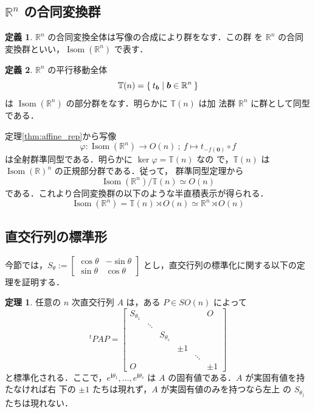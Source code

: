 \documentclass[11pt, uplatex, dvipdfmx, titlepage]{jsarticle}
\renewcommand{\i}{\mathbf{i}}
\DeclareMathOperator{\Isom}{Isom}
\theoremstyle{definition}
\newtheorem{theorem}{定理}[section]
\newtheorem*{definition}{定義}
\begin{document}
\subsection{$\mathbb{R}^n$ の合同変換群}

\begin{definition}
  $\mathbb{R}^n$ の合同変換全体は写像の合成により群をなす．この群
  を $\mathbb{R}^n$ の合同変換群といい，$\Isom(\mathbb{R}^n)$ で表す．
\end{definition}

\begin{definition}
  $\mathbb{R}^n$ の平行移動全体
  \[
    \mathbb{T}(n)=\Set{ t_{\bm{b}} | \bm{b} \in \mathbb{R}^n}
  \]
  は $\Isom(\mathbb{R}^n)$ の部分群をなす．明らかに $\mathbb{T}(n)$ は加
  法群 $\mathbb{R}^n$ に群として同型である．
\end{definition}


定理\ref{thm:affine_rep}から写像
\[
  \varphi : \Isom(\mathbb{R}^n) \to O(n) \ ; \ f \mapsto t_{-f(\bm{0})} \circ f
\]
は全射群準同型である．明らかに $\ker \varphi = \mathbb{T}(n)$ なの
で，$\mathbb{T}(n)$ は $\Isom(\mathbb{R})^n$ の正規部分群である．従って，
群準同型定理から
\[
  \Isom(\mathbb{R}^n)/\mathbb{T}(n) \simeq O(n)
\]
である．これより合同変換群の以下のような半直積表示が得られる．
\[
  \Isom(\mathbb{R}^n) = \mathbb{T}(n) \rtimes O(n) \simeq \mathbb{R}^n \rtimes O(n)
\]

\subsection{直交行列の標準形}

今節では，$S_{\theta}:=\left[
    \begin{array}{rr}
      \cos \theta & -\sin \theta\\
      \sin \theta & \cos \theta
    \end{array}
  \right]$ とし，直交行列の標準化に関する以下の定理を証明する．

  \begin{theorem}\label{thm:stdform}
    任意の $n$ 次直交行列 $A$ は，ある $P \in SO(n)$ によって 
    \begin{equation}\label{eq:std}
      {}^{t}PAP = \left[
        \begin{array}{cccccc}
          S_{\theta_1} & & & & & O\\
                       & \ddots & & & & \\
                       & & S_{\theta_s} & & &\\
                       & & & \pm 1 & &\\
                       & & & & \ddots &\\
          O & & & & & \pm 1
        \end{array}
      \right]
    \end{equation}
    と標準化される．ここで，$e^{\i \theta_1}, \ldots,
    e^{\i\theta_s}$ は $A$ の固有値である．$A$ が実固有値を持たなければ右
    下の $\pm 1$ たちは現れず，$A$ が実固有値のみを持つなら左上
    の $S_{\theta_j}$ たちは現れない．
  \end{theorem}
\end{document}
